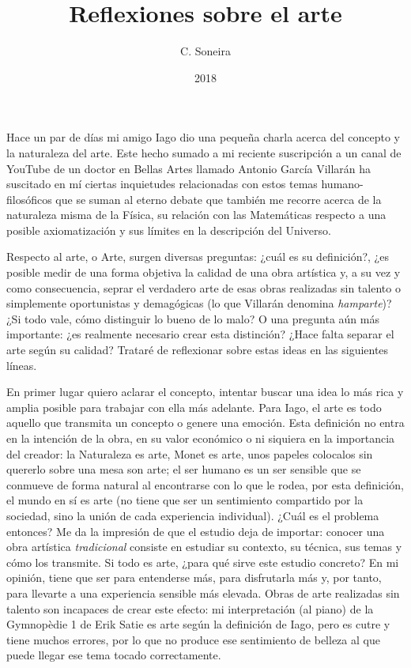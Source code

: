 \documentclass[a4paper,12pt]{article}
\title{Reflexiones sobre el arte}
\author{C. Soneira}
\date{2018}
\begin{document}
\maketitle
Hace un par de días mi amigo Iago dio una pequeña charla acerca del concepto y la naturaleza del arte. Este hecho sumado a mi reciente suscripción a un canal de YouTube de un doctor en Bellas Artes llamado Antonio García Villarán ha suscitado en mí ciertas inquietudes relacionadas con estos temas humano-filosóficos que se suman al eterno debate que también me recorre acerca de la naturaleza misma de la Física, su relación con las Matemáticas respecto a una posible axiomatización y sus límites en la descripción del Universo.

Respecto al arte, o Arte, surgen diversas preguntas: ¿cuál es su definición?, ¿es posible medir de una forma objetiva la calidad de una obra artística y, a su vez y como consecuencia, seprar el verdadero arte de esas obras realizadas sin talento o simplemente oportunistas y demagógicas (lo que Villarán denomina \textit{hamparte})? ¿Si todo vale, cómo distinguir lo bueno de lo malo? O una pregunta aún más importante: ¿es realmente necesario crear esta distinción? ¿Hace falta separar el arte según su calidad? Trataré de reflexionar sobre estas ideas en las siguientes líneas.

En primer lugar quiero aclarar el concepto, intentar buscar una idea lo más rica y amplia posible para trabajar con ella más adelante. Para Iago, el arte es todo aquello que transmita un concepto o genere una emoción. Esta definición no entra en la intención de la obra, en su valor económico o ni siquiera en la importancia del creador: la Naturaleza es arte, Monet es arte, unos papeles colocalos sin quererlo sobre una mesa son arte; el ser humano es un ser sensible que se conmueve de forma natural al encontrarse con lo que le rodea, por esta definición, el mundo en sí es arte (no tiene que ser un sentimiento compartido por la sociedad, sino la unión de cada experiencia individual). ¿Cuál es el problema entonces? Me da la impresión de que el estudio deja de importar: conocer una obra artística \textit{tradicional} consiste en estudiar su contexto, su técnica, sus temas y cómo los transmite. Si todo es arte, ¿para qué sirve este estudio concreto? En mi opinión, tiene que ser para entenderse más, para disfrutarla más y, por tanto, para llevarte a una experiencia sensible más elevada. Obras de arte realizadas sin talento son incapaces de crear este efecto: mi interpretación (al piano) de la Gymnopèdie 1 de Erik Satie es arte según la definición de Iago, pero es cutre y tiene muchos errores, por lo que no produce ese sentimiento de belleza al que puede llegar ese tema tocado correctamente.
\end{document}
